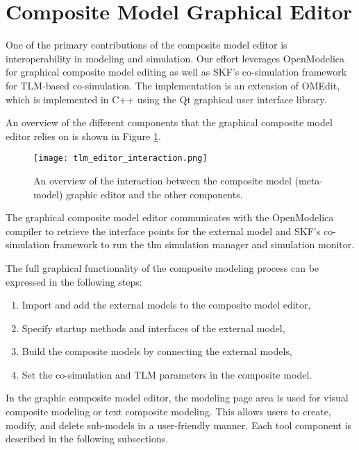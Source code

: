 \section{Composite Model Graphical Editor}
\label{sec:tlmeditor}

One of the primary contributions of the composite model editor is interoperability in modeling and simulation.
Our effort leverages OpenModelica for graphical composite model editing as well as SKF’s co-simulation framework for TLM-based co-simulation.
The implementation is an extension of OMEdit, which is implemented in C++ using the Qt graphical user interface library.

An overview of the different components that the graphical composite model editor relies on is shown in Figure \ref{fig:tlmeditorinteraction}.

\begin{figure} [!h]
	\texttt{[image: tlm\_editor\_interaction.png]}
	\caption{An overview of the interaction between the composite model (meta-model) graphic editor and the other components.}
	\label{fig:tlmeditorinteraction}
\end{figure}

The graphical composite model editor communicates with the OpenModelica compiler to retrieve the interface points for the external model and SKF’s co-simulation framework
to run the \acrshort{tlm} simulation manager and simulation monitor.
 
The full graphical functionality of the composite modeling process can be expressed in the following steps:

\begin{enumerate}
	
	\item Import and add the external models to the composite model editor,
	\item Specify startup methods and interfaces of the external model,
	\item Build the composite models by connecting the external models,
	\item Set the co-simulation and TLM parameters in the composite model.
	
\end{enumerate}

In the graphic composite model editor, the modeling page area is used for visual composite modeling or text
composite modeling. This allows users to create, modify, and delete sub-models in a user-friendly manner.
Each tool component is described in the following subsections. 

